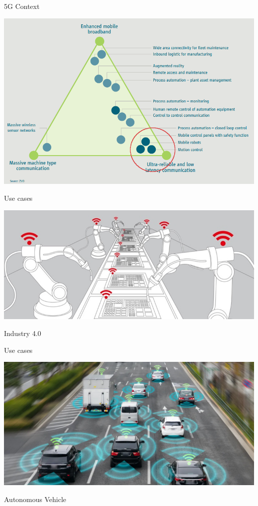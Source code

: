 \documentclass[10 pt]{beamer}
\begin{document}
\begin{frame}{5G Context}


  \centering
  
  \includegraphics[scale=0.4]{usecases.png}
  

\end{frame}
\begin{frame}{Use cases}


  \centering
  
  \includegraphics[scale=0.4]{ind40.jpg}

  Industry 4.0

\end{frame}
\begin{frame}{Use cases}


  \centering
  
  \includegraphics[scale=0.25]{vehicle.jpg}

  Autonomous Vehicle

\end{frame}
\end{document}
